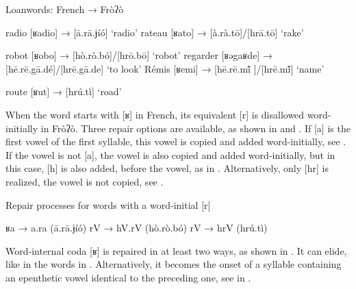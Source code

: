 \documentclass[output=paper]{langscibook}
\begin{document}
\begin{exe}
    \ex Loanwords: French → Fròʔò \label{ex:traore:41}
    \begin{xlist}
        \ex 
        \begin{xlist}
        \ex  radio             [ʁadio]         →         [ā.rā.ɉíó]                             ‘radio’
         \ex rateau           [ʁato]             →         [à.rà.tō]/[hrā.tō]                     ‘rake’ 
         \end{xlist}
        \ex 
        \begin{xlist}
        \ex robot             [ʁobo]          →         [hò.rò.bó]/[hrō.bō]                ‘robot’  
        \ex regarder       [ʁəgaʁde]      →         [hē.rē.gā.dé]/[hrē.gā.de]        ‘to look’  
        \ex Rémis           [ʁemi]          →         [hē.rē.mĩ́ ]/[hrē.mĩ́]               ‘name’ 
         \end{xlist}
        \ex 
        \begin{xlist}
         \ex route             [ʁut]            →         [hrú.tì]                                ‘road’   
         \end{xlist}
    \end{xlist}
\end{exe} 

When the word starts with [ʁ] in French, its equivalent [r] is disallowed word-initially in Fròʔò. Three repair options are available, as shown in  and . If [a] is the first vowel of the first syllable, this vowel is copied and added word-initially, see . If the vowel is not [a], the vowel is also copied and added word-initially, but in this case, [h] is also added, before the vowel, as in . Alternatively, only [hr] is realized, the vowel is not copied, see .

\noindent\parbox{\textwidth}{\begin{exe}
     \ex Repair processes for words with a word-initial [r]\label{ex:traore:42}
        \begin{xlist}
            \ex ʁa   →  a.ra (ā.rā.ɉíó) \label{ex:traore:42a}
            \ex rV   →  hV.rV (hò.rò.bó)\label{ex:traore:42b}
            \ex rV   →  hrV (hrú.tì)\label{ex:traore:42c}
        \end{xlist}
 \end{exe}}

Word-internal coda [ʁ] is repaired in at least two ways, as shown in . It can elide, like in the words in . Alternatively, it becomes the onset of a syllable containing an epenthetic vowel identical to the preceding one, see in . 
\end{document}

